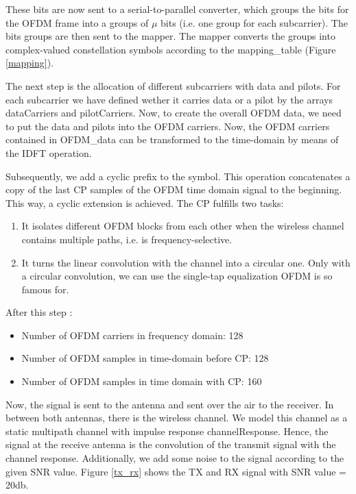 These bits are now sent to a serial-to-parallel converter, which groups the bits for the OFDM frame into a groups of $\mu$ bits (i.e. one group for each subcarrier). The bits groups are then sent to the mapper. The mapper converts the groups into complex-valued constellation symbols according to the mapping\_table (Figure \ref{mapping}).

The next step is the allocation of different subcarriers with data and pilots. For each subcarrier we have defined wether it carries data or a pilot by the arrays dataCarriers and pilotCarriers. Now, to create the overall OFDM data, we need to put the data and pilots into the OFDM carriers. Now, the OFDM carriers contained in OFDM\_data can be transformed to the time-domain by means of the IDFT operation.

Subsequently, we add a cyclic prefix to the symbol. This operation concatenates a copy of the last CP samples of the OFDM time domain signal to the beginning. This way, a cyclic extension is achieved. The CP fulfills two tasks:
\begin{enumerate}
    \item It isolates different OFDM blocks from each other when the wireless channel contains multiple paths, i.e. is frequency-selective.
    \item It turns the linear convolution with the channel into a circular one. Only with a circular convolution, we can use the single-tap equalization OFDM is so famous for.
\end{enumerate}

After this step :
\begin{itemize}
    \item Number of OFDM carriers in frequency domain: 128
    \item Number of OFDM samples in time-domain before CP: 128
    \item Number of OFDM samples in time domain with CP: 160
\end{itemize}

Now, the signal is sent to the antenna and sent over the air to the receiver. In between both antennas, there is the wireless channel. We model this channel as a static multipath channel with impulse response channelResponse. Hence, the signal at the receive antenna is the convolution of the transmit signal with the channel response. Additionally, we add some noise to the signal according to the given SNR value. Figure \ref{tx_rx} shows the TX and RX signal with SNR value = 20db.

